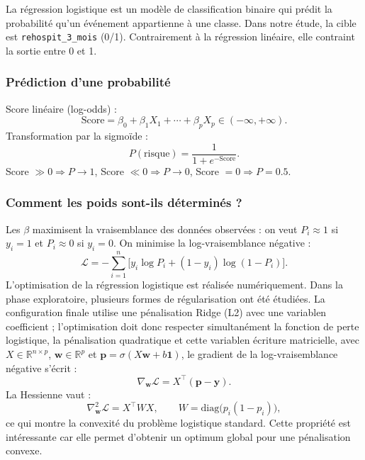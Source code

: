 \documentclass[12pt,a4paper]{report}
\begin{document}
La régression logistique est un modèle de classification binaire qui prédit la probabilité
qu'un événement appartienne à une classe. Dans notre étude, la cible est
\texttt{rehospit\_3\_mois} (0/1). Contrairement à la régression linéaire, elle contraint la
sortie entre 0 et 1.

\subsubsection{Prédiction d'une probabilité}

Score linéaire (log-odds) :
\begin{equation}
 \text{Score}= \beta_0 + \beta_1 X_1 + \cdots + \beta_p X_p \in (-\infty,+\infty).
\end{equation}
Transformation par la sigmoïde :
\begin{equation}
 P(\text{risque}) = \frac{1}{1+e^{-\text{Score}}}.
\end{equation}
Score $\gg 0 \Rightarrow P\to 1$, Score $\ll 0 \Rightarrow P\to 0$, Score $=0 \Rightarrow
P=0.5$.

\subsubsection{Comment les poids sont-ils déterminés ?}

Les $\beta$ maximisent la vraisemblance des données observées : on veut $P_i\approx 1$ si
$y_i=1$ et $P_i\approx 0$ si $y_i=0$. On minimise la log-vraisemblance négative :
\begin{equation}
 \mathcal{L}= -\sum_{i=1}^n \bigl[ y_i \log P_i + (1-y_i)\log(1-P_i) \bigr].
\end{equation}
L'optimisation de la régression logistique est réalisée numériquement. Dans la phase exploratoire, plusieurs formes de régularisation ont été étudiées. La configuration finale utilise une pénalisation Ridge (L2) avec une variablen coefficient ; l'optimisation doit donc respecter simultanément la fonction de perte logistique, la pénalisation quadratique et cette variablen écriture matricielle, avec $X\in\mathbb{R}^{n\times p}$, $\mathbf{w}\in\mathbb{R}^{p}$
et $\mathbf{p}=\sigma(X\mathbf{w}+b\mathbf{1})$, le gradient de la log-vraisemblance
négative s'écrit :
\begin{equation}
 \nabla_{\mathbf{w}}\mathcal{L}=X^{\top}(\mathbf{p}-\mathbf{y}).
\end{equation}
La Hessienne vaut :
\begin{equation}
 \nabla^2_{\mathbf{w}}\mathcal{L}=X^{\top}WX,
 \qquad W=\mathrm{diag}\bigl(p_i(1-p_i)\bigr),
\end{equation}
ce qui montre la convexité du problème logistique standard. Cette propriété est
intéressante car elle permet d'obtenir un optimum global pour une pénalisation convexe.
\end{document}

